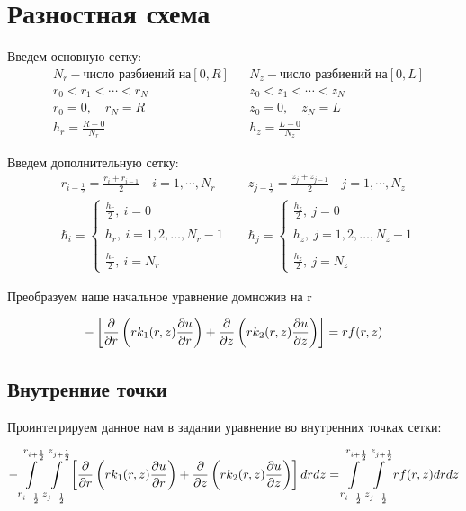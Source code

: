 \section{Разностная схема}
Введем основную сетку:
\begin{align*}
  &N_r - \text{число разбиений на} [0, R] & &N_z - \text{число разбиений на} [0, L] \\
  &r_0 < r_1 < \cdots < r_N & &z_0 < z_1 < \cdots < z_N \\
  &r_0 = 0,\quad r_N = R & &z_0 = 0,\quad z_N = L \\
  &h_r = \frac{R - 0}{N_r} & &h_z = \frac{L - 0}{N_z}
\end{align*}

Введем дополнительную сетку:
\begin{align*}
  &r_{i-\frac{1}{2}} = \frac{r_i + r_{i - 1}}{2}\quad i=1,\cdots, N_r & &z_{j-\frac{1}{2}} = \frac{z_j + z_{j - 1}}{2}\quad j=1,\cdots, N_z \\
  & \hbar_i = \begin{cases}
    \frac{h_r}{2},\ i = 0 \\ \\
    h_r,\ i = 1, 2, \dots, N_r-1 \\ \\
    \frac{h_r}{2},\ i = N_r
  \end{cases} &
  & \hbar_j = \begin{cases}
    \frac{h_z}{2},\ j = 0 \\ \\
    h_z,\ j = 1, 2, \dots, N_z-1 \\ \\
    \frac{h_z}{2},\ j = N_z
  \end{cases}
\end{align*}

Преобразуем наше начальное уравнение домножив на r

\[
  - \left [ \pdv{}{r} \left ( r k_1(r, z) \pdv{u}{r} \right ) 
  + \pdv{}{z} \left ( rk_2(r, z)\pdv{u}{z} \right ) \right ] = rf(r, z)
\]

\subsection{Внутренние точки}
Проинтегрируем данное нам в задании уравнение во внутренних точках сетки:

\[
  - \int\limits^{r_{i +\frac{1}{2}}}_{r_{i -\frac{1}{2}}} \int\limits^{z_{j +\frac{1}{2}}}_{z_{j -\frac{1}{2}}} \left [ \pdv{}{r} \left ( r k_1(r, z) \pdv{u}{r} \right ) 
  + \pdv{}{z} \left ( rk_2(r, z)\pdv{u}{z} \right ) \right ] dr dz = \int\limits^{r_{i +\frac{1}{2}}}_{r_{i -\frac{1}{2}}} \int\limits^{z_{j +\frac{1}{2}}}_{z_{j -\frac{1}{2}}} rf(r, z) dr dz
\]

